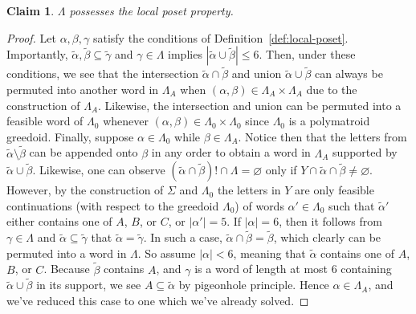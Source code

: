\documentclass[11pt]{article}
\newtheorem*{claim}{Claim}
\newcommand{\univ}{\Sigma}
\newcommand{\glang}{\Lambda}
\begin{document}
\begin{claim}
    $\glang$ possesses the local poset property.
\end{claim}
\begin{proof}
    Let $\alpha,\beta,\gamma$ satisfy the conditions of Definition~\ref{def:local-poset}.
    Importantly, $\widetilde{\alpha},\widetilde{\beta}\subseteq\widetilde{\gamma}$ and $\gamma \in \glang$ implies $|\widetilde{\alpha}\cup\widetilde{\beta}| \leq 6$.
    Then, under these conditions, we see that the intersection $\widetilde{\alpha}\cap\widetilde{\beta}$ and union $\widetilde{\alpha}\cup\widetilde{\beta}$ can always be permuted into another word in $\glang_A$ when $(\alpha,\beta) \in \glang_A\times\glang_A$ due to the construction of $\glang_A$.
    Likewise, the intersection and union can be permuted into a feasible word of $\glang_0$ whenever $(\alpha,\beta)\in\glang_0\times\glang_0$ since $\glang_0$ is a polymatroid greedoid.
    Finally, suppose $\alpha\in\glang_0$ while $\beta \in \glang_A$.
    Notice then that the letters from $\widetilde{\alpha}\setminus\widetilde{\beta}$ can be appended onto $\beta$ in any order to obtain a word in $\glang_A$ supported by $\widetilde{\alpha}\cup\widetilde{\beta}$.
    Likewise, one can observe $(\widetilde{\alpha}\cap\widetilde{\beta})!\cap\glang = \varnothing$ only if $Y \cap \widetilde{\alpha}\cap\widetilde{\beta} \neq \varnothing$.
    However, by the construction of $\univ$ and $\glang_0$ the letters in $Y$ are only feasible continuations (with respect to the greedoid $\glang_0$) of words $\alpha' \in \glang_0$ such that $\widetilde{\alpha}'$ either contains one of $A$, $B$, or $C$, or $|\alpha'| = 5$.
    If $|\alpha| = 6$, then it follows from $\gamma \in \glang$ and $\widetilde{\alpha}\subseteq\widetilde{\gamma}$ that $\widetilde{\alpha} = \widetilde{\gamma}$.
    In such a case, $\widetilde{\alpha}\cap\widetilde{\beta} = \widetilde{\beta}$, which clearly can be permuted into a word in $\glang$.
    So assume $|\alpha| < 6$, meaning that $\widetilde{\alpha}$ contains one of $A$, $B$, or $C$.
    Because $\widetilde{\beta}$ contains $A$, and $\gamma$ is a word of length at most 6 containing $\widetilde{\alpha}\cup\widetilde{\beta}$ in its support, we see $A\subseteq \widetilde{\alpha}$ by pigeonhole principle.
    Hence $\alpha \in \glang_A$, and we've reduced this case to one which we've already solved.
\end{proof}
\end{document}
